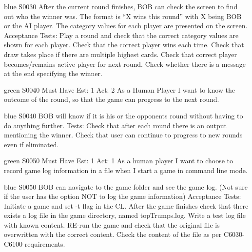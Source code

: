 \begin{card}{blue}
{S0030}{}{}{}
After the current round finishes, BOB can check the screen to find out who the winner was. 
The format is ``X wins this round'' with X being BOB or the AI player. 
The category values for each player are presented on the screen. 
Acceptance Tests: Play a round and check that the correct category values are shown for each player. 
Check that the correct player wins each time. Check that draw takes place if there are multiple highest cards. 
Check that correct player becomes/remains active player for next round. 
Check whether there is a message at the end specifying the winner.
\end{card}


\newpage

\begin{card}{green}
{S0040}
{Must Have}
{Est: 1}
{Act: 2}
As a Human Player I want to know the outcome of the round, so that the game can progress to the next round.
\end{card}

\begin{card}{blue}
{S0040}{}{}{}
BOB will know if it is his or the opponents round without having to do anything further.
Tests: Check that after each round there is an output mentioning the winner. 
Check that user can continue to progress to new rounds even if eliminated.
\end{card}


\newpage

\begin{card}{green}
{S0050}
{Must Have}
{Est: 1}
{Act: 1}
As a human player I want to choose to record game log information in a file when I start a game in command line mode.
\end{card}

\begin{card}{blue}
{S0050}{}{}{}
BOB can navigate to the game folder and see the game log. 
(Not sure if the user has the option NOT to log the game information) 
Acceptance Tests: Initiate a game and set -t flag in the CL. 
After the game finishes check that there exists a log file in the game directory, named topTrumps.log. 
Write a test log file with known content. 
RE-run the game and check that the original file is overwritten with the correct content. 
Check the content of the file as per C6030- C6100 requirements.
\end{card}

